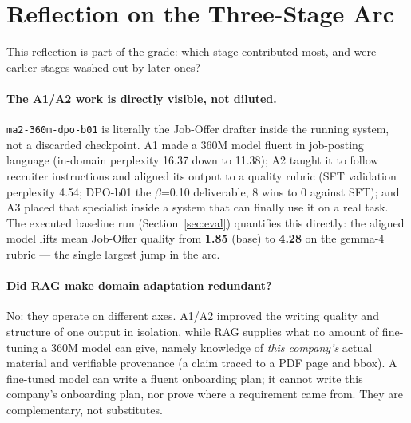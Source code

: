 \section{Reflection on the Three-Stage Arc}
\label{sec:arc}

This reflection is part of the grade: which stage contributed most, and were earlier stages
washed out by later ones?

\paragraph{The A1/A2 work is directly visible, not diluted.}
\verb|ma2-360m-dpo-b01| is literally the Job-Offer drafter inside the running system, not a
discarded checkpoint. A1 made a 360M model fluent in job-posting language (in-domain
perplexity 16.37 down to 11.38); A2 taught it to follow recruiter instructions and aligned
its output to a quality rubric (SFT validation perplexity 4.54; DPO-b01 the $\beta$=0.10
deliverable, 8 wins to 0 against SFT); and A3 placed that specialist inside a system that
can finally use it on a real task. The executed baseline run (Section~\ref{sec:eval})
quantifies this directly: the aligned model lifts mean Job-Offer quality from \textbf{1.85}
(base) to \textbf{4.28} on the gemma-4 rubric --- the single largest jump in the arc.

\paragraph{Did RAG make domain adaptation redundant?}
No: they operate on different axes. A1/A2 improved the writing quality and structure of one
output in isolation, while RAG supplies what no amount of fine-tuning a 360M model can give,
namely knowledge of \emph{this company's} actual material and verifiable provenance (a claim
traced to a PDF page and bbox). A fine-tuned model can write a fluent onboarding plan; it
cannot write this company's onboarding plan, nor prove where a requirement came from. They
are complementary, not substitutes.

